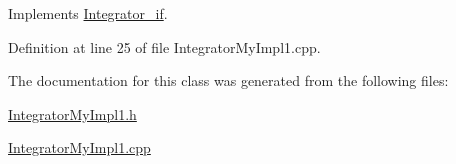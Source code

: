 Implements \hyperlink{class_integrator__if_a49c27818a4b0caf41c39d22a18b41337}{Integrator\-\_\-if}.



Definition at line 25 of file Integrator\-My\-Impl1.\-cpp.



The documentation for this class was generated from the following files\-:\begin{DoxyCompactItemize}
\item 
\hyperlink{_integrator_my_impl1_8h}{Integrator\-My\-Impl1.\-h}\item 
\hyperlink{_integrator_my_impl1_8cpp}{Integrator\-My\-Impl1.\-cpp}\end{DoxyCompactItemize}
